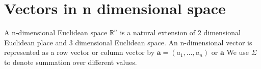 \section{Vectors in n dimensional space}
A n-dimensional Euclidean space $\mathbb{R}^n$ is a natural extension of 2 dimensional Euclidean place and 3 dimensional Euclidean space. An n-dimensional vector is represented as a row vector or column vector by $\mathbf{a} = (a_1, \dots, a_n)$ or $\mathbf{a}$
We use $\Sigma$ to denote summation over different values.
